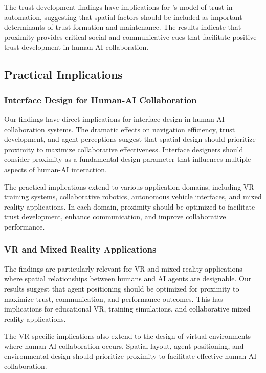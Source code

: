\documentclass[12pt]{article}
\begin{document}
The trust development findings have implications for \citeauthor{lee2004trust}'s \citeyear{lee2004trust} model of trust in automation, suggesting that spatial factors should be included as important determinants of trust formation and maintenance. The results indicate that proximity provides critical social and communicative cues that facilitate positive trust development in human-AI collaboration.

\subsection{Practical Implications}

\subsubsection{Interface Design for Human-AI Collaboration}

Our findings have direct implications for interface design in human-AI collaboration systems. The dramatic effects on navigation efficiency, trust development, and agent perceptions suggest that spatial design should prioritize proximity to maximize collaborative effectiveness. Interface designers should consider proximity as a fundamental design parameter that influences multiple aspects of human-AI interaction.

The practical implications extend to various application domains, including VR training systems, collaborative robotics, autonomous vehicle interfaces, and mixed reality applications. In each domain, proximity should be optimized to facilitate trust development, enhance communication, and improve collaborative performance.

\subsubsection{VR and Mixed Reality Applications}

The findings are particularly relevant for VR and mixed reality applications where spatial relationships between humans and AI agents are designable. Our results suggest that agent positioning should be optimized for proximity to maximize trust, communication, and performance outcomes. This has implications for educational VR, training simulations, and collaborative mixed reality applications.

The VR-specific implications also extend to the design of virtual environments where human-AI collaboration occurs. Spatial layout, agent positioning, and environmental design should prioritize proximity to facilitate effective human-AI collaboration.
\end{document}
